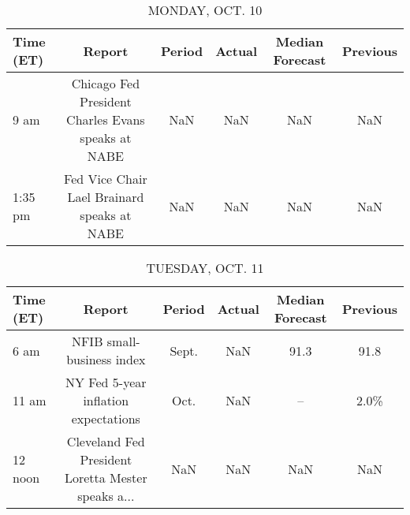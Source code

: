 \documentclass{article}%
\begin{document}
%
\normalsize%


\begin{table}[htbp]%
\caption{MONDAY, OCT. 10}%
\centering%
\begin{adjustbox}{width=1\textwidth}%
\begin{tabular}{lccccc}
\toprule
Time (ET) &                                             Report & Period & Actual & Median Forecast & Previous \\
\midrule
     9 am & Chicago Fed President Charles Evans speaks at NABE &    NaN &    NaN &             NaN &      NaN \\
  1:35 pm &        Fed Vice Chair Lael Brainard speaks at NABE &    NaN &    NaN &             NaN &      NaN \\
\bottomrule
\end{tabular}
%
\end{adjustbox}%
\end{table}

%


\begin{table}[htbp]%
\caption{TUESDAY, OCT. 11}%
\centering%
\begin{adjustbox}{width=1\textwidth}%
\begin{tabular}{lccccc}
\toprule
Time (ET) &                                             Report & Period & Actual & Median Forecast & Previous \\
\midrule
     6 am &                          NFIB small-business index &  Sept. &    NaN &            91.3 &     91.8 \\
    11 am &               NY Fed 5-year inflation expectations &   Oct. &    NaN &              -- &     2.0\% \\
  12 noon & Cleveland Fed President Loretta Mester speaks a... &    NaN &    NaN &             NaN &      NaN \\
\bottomrule
\end{tabular}
%
\end{adjustbox}%
\end{table}

%
\end{document}
